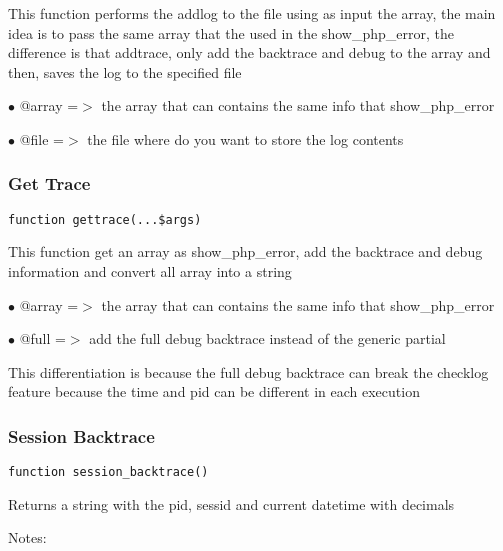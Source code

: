 \documentclass[a4paper]{article}
\begin{document}
This function performs the addlog to the file using as input the array, the
main idea is to pass the same array that the used in the show\_php\_error, the
difference is that addtrace, only add the backtrace and debug to the array
and then, saves the log to the specified file

\begin{compactitem}
\item[\color{myblue}$\bullet$] @array =$>$ the array that can contains the same info that show\_php\_error
\item[\color{myblue}$\bullet$] @file  =$>$ the file where do you want to store the log contents
\end{compactitem}

\hypertarget{toc164}{}
\subsubsection{Get Trace}

\begin{lstlisting}
function gettrace(...$args)
\end{lstlisting}

This function get an array as show\_php\_error, add the backtrace and debug
information and convert all array into a string

\begin{compactitem}
\item[\color{myblue}$\bullet$] @array =$>$ the array that can contains the same info that show\_php\_error
\item[\color{myblue}$\bullet$] @full  =$>$ add the full debug backtrace instead of the generic partial
\end{compactitem}

This differentiation is because the full debug backtrace can break the
checklog feature because the time and pid can be different in each
execution

\hypertarget{toc165}{}
\subsubsection{Session Backtrace}

\begin{lstlisting}
function session_backtrace()
\end{lstlisting}

Returns a string with the pid, sessid and current datetime with decimals

Notes:
\end{document}
